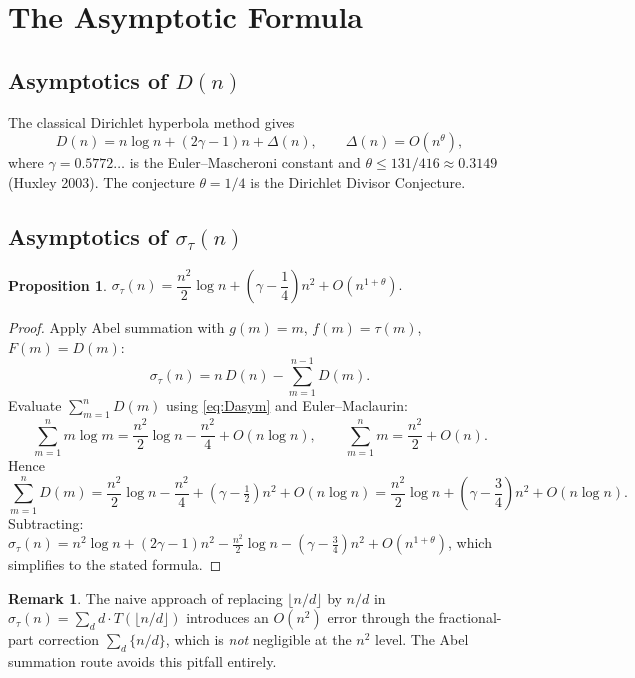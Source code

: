 \documentclass[12pt]{article}
\newtheorem{proposition}[theorem]{Proposition}
\theoremstyle{definition}
\newtheorem{remark}[theorem]{Remark}
\begin{document}
\section{The Asymptotic Formula}

\subsection{Asymptotics of \texorpdfstring{$D(n)$}{D(n)}}

The classical Dirichlet hyperbola method gives
\begin{equation}
    D(n) = n\log n + (2\gamma-1)n + \Delta(n),
    \qquad \Delta(n) = O\!\left(n^\theta\right),
    \label{eq:Dasym}
\end{equation}
where $\gamma = 0.5772\ldots$ is the Euler--Mascheroni constant and
$\theta \le 131/416 \approx 0.3149$ (Huxley 2003).
The conjecture $\theta = 1/4$ is the Dirichlet Divisor Conjecture.

\subsection{Asymptotics of \texorpdfstring{$\sigma_\tau(n)$}{sigma\_tau(n)}}

\begin{proposition}
\label{prop:sigmatau}
$\sigma_\tau(n) = \dfrac{n^2}{2}\log n + \left(\gamma - \dfrac{1}{4}\right)n^2
+ O\!\left(n^{1+\theta}\right).$
\end{proposition}

\begin{proof}
Apply Abel summation with $g(m) = m$, $f(m) = \tau(m)$, $F(m) = D(m)$:
\[
    \sigma_\tau(n) = n\,D(n) - \sum_{m=1}^{n-1} D(m).
\]
Evaluate $\sum_{m=1}^n D(m)$ using \eqref{eq:Dasym} and Euler--Maclaurin:
\[
    \sum_{m=1}^n m\log m = \frac{n^2}{2}\log n - \frac{n^2}{4} + O(n\log n),
    \qquad
    \sum_{m=1}^n m = \frac{n^2}{2} + O(n).
\]
Hence
\[
    \sum_{m=1}^n D(m) = \frac{n^2}{2}\log n
        - \frac{n^2}{4} + (\gamma-\tfrac{1}{2})n^2 + O(n\log n)
    = \frac{n^2}{2}\log n + \left(\gamma-\frac{3}{4}\right)n^2
        + O(n\log n).
\]
Subtracting: $\sigma_\tau(n) = n^2\log n + (2\gamma-1)n^2
  - \tfrac{n^2}{2}\log n - (\gamma-\tfrac{3}{4})n^2 + O(n^{1+\theta})$,
which simplifies to the stated formula.
\end{proof}

\begin{remark}
The naive approach of replacing $\lfloor n/d\rfloor$ by $n/d$ in
$\sigma_\tau(n) = \sum_d d\cdot T(\lfloor n/d\rfloor)$ introduces an
$O(n^2)$ error through the fractional-part correction
$\sum_d \{n/d\}$, which is \emph{not} negligible at the $n^2$ level.
The Abel summation route avoids this pitfall entirely.
\end{remark}
\end{document}
